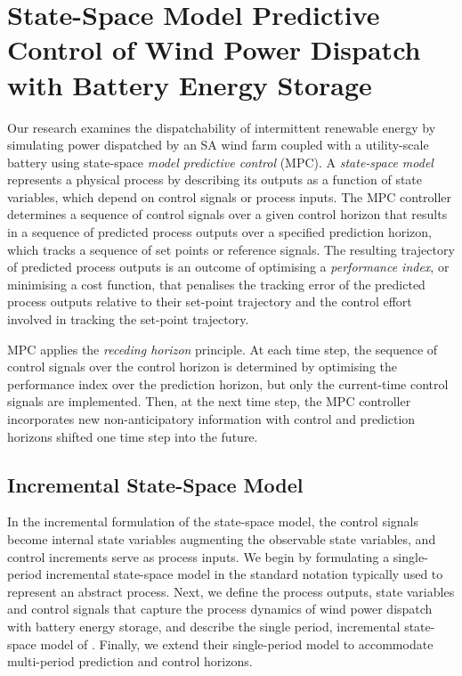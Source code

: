 \documentclass[a4paper, 10pt, twocolumn, preprint, 3p]{elsarticle}
\begin{document}
\section{State-Space Model Predictive Control of Wind Power Dispatch with Battery Energy Storage}\label{sect:ssmpc_dispatch}
Our research examines the dispatchability of intermittent renewable energy by simulating power dispatched by an SA wind farm coupled with a utility-scale battery using state-space \textit{model predictive control} (MPC).  A \textit{state-space model} represents a physical process by describing its outputs as a function of state variables, which depend on control signals or process inputs.  The MPC controller determines a sequence of control signals over a given control horizon that results in a sequence of predicted process outputs over a specified prediction horizon, which tracks a sequence of set points or reference signals.  The resulting trajectory of predicted process outputs is an outcome of optimising a \textit{performance index}, or minimising a cost function, that penalises the tracking error of the predicted process outputs relative to their set-point trajectory and the control effort involved in tracking the set-point trajectory.

MPC applies the \textit{receding horizon} principle.  At each time step, the sequence of control signals over the control horizon is determined by optimising the performance index over the prediction horizon, but only the current-time control signals are implemented.  Then, at the next time step, the MPC controller incorporates new non-anticipatory information with control and prediction horizons shifted one time step into the future.

\subsection{Incremental State-Space Model}\label{sect:state_space_model}
In the incremental formulation of the state-space model, the control signals become internal state variables augmenting the observable state variables, and control increments serve as process inputs.  We begin by formulating a single-period incremental state-space model in the standard notation typically used to represent an abstract process.  Next, we define the process outputs, state variables and control signals that capture the process dynamics of wind power dispatch with battery energy storage, and describe the single period, incremental state-space model of \cite{TREB16}.  Finally, we extend their single-period model to accommodate multi-period prediction and control horizons.
\end{document}
